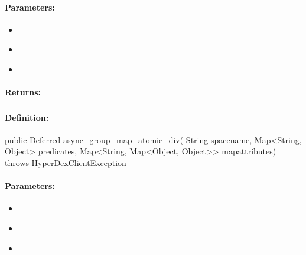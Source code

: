 \paragraph{Parameters:}
\begin{itemize}[noitemsep]
\item {}\\

\item {}\\

\item {}\\

\end{itemize}

\paragraph{Returns:}


\pagebreak
\subsubsection{}
\label{api:java:async_group_map_atomic_div}


\paragraph{Definition:}
\begin{javacode}
public Deferred async_group_map_atomic_div(
        String spacename,
        Map<String, Object> predicates,
        Map<String, Map<Object, Object>> mapattributes) throws HyperDexClientException
\end{javacode}

\paragraph{Parameters:}
\begin{itemize}[noitemsep]
\item {}\\

\item {}\\

\item {}\\

\end{itemize}


